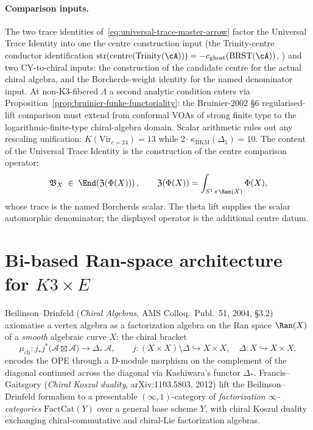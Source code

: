 \paragraph{Comparison inputs.}
The two trace identities of~\eqref{eq:universal-trace-master-arrow}
factor the Universal Trace Identity into one the centre construction input
(the Trinity-centre conductor identification
$\mathrm{str}(\mathrm{centre}(\mathrm{Trinity}(\cA))) = -c_{\mathrm{ghost}}(\mathrm{BRST}(\cA))$,
\cite{VolII}) and two CY-to-chiral inputs: the construction of the
candidate centre for the actual chiral algebra, and the Borcherds-weight
identity for the named denominator input. At non-K$3$-fibered $\Lambda$ a second
analytic condition enters via
Proposition~\ref{prop:bruinier-funke-functoriality}: the Bruinier-2002
\S 6 regularised-lift comparison must extend from conformal VOAs of
strong finite type to the logarithmic-finite-type chiral-algebra
domain. Scalar arithmetic rules out any rescaling unification:
$K(\mathrm{Vir}_{c=24}) = 13$ while
$2\cdot\kappa_{\mathrm{BKM}}(\Delta_5) = 10$. The content of the
Universal Trace Identity is the construction of the centre comparison
operator:
\[
 \mathfrak{B}_X \;\in\;
 \End\!\left(\mathfrak{Z}(\Phi(X))\right),
 \qquad
 \mathfrak{Z}(\Phi(X))=\int_{S^1\times\Ran(X)}\Phi(X),
\]
whose trace is the named Borcherds scalar.  The theta lift supplies the
scalar automorphic denominator; the displayed operator is the additional
centre datum.


\section{Bi-based Ran-space architecture for \texorpdfstring{$K3\times E$}{K3x E}}
\label{sec:bar-cobar-bi-based-k3e}

Beilinson--Drinfeld (\emph{Chiral Algebras}, AMS Colloq.~Publ.~51, 2004, \S3.2) axiomatise a vertex algebra as a factorization algebra on the Ran space $\Ran(X)$ of a \emph{smooth} algebraic curve $X$: the chiral bracket
\[
 \mu_{\mathrm{ch}}\colon
 j_* j^*\bigl(\mathcal{A}\boxtimes\mathcal{A}\bigr)
 \longrightarrow
 \Delta_*\,\mathcal{A},
 \qquad
 j\colon (X\times X)\setminus\Delta \hookrightarrow X\times X,\quad
 \Delta\colon X\hookrightarrow X\times X,
\]
encodes the OPE through a D-module morphism on the complement of the diagonal continued across the diagonal via Kashiwara's functor $\Delta_*$. Francis--Gaitsgory (\emph{Chiral Koszul duality}, arXiv:1103.5803, 2012) lift the Beilinson--Drinfeld formalism to a presentable $(\infty,1)$-category of \emph{factorization $\infty$-categories} $\mathrm{FactCat}(Y)$ over a general base scheme $Y$, with chiral Koszul duality exchanging chiral-commutative and chiral-Lie factorization algebras.


